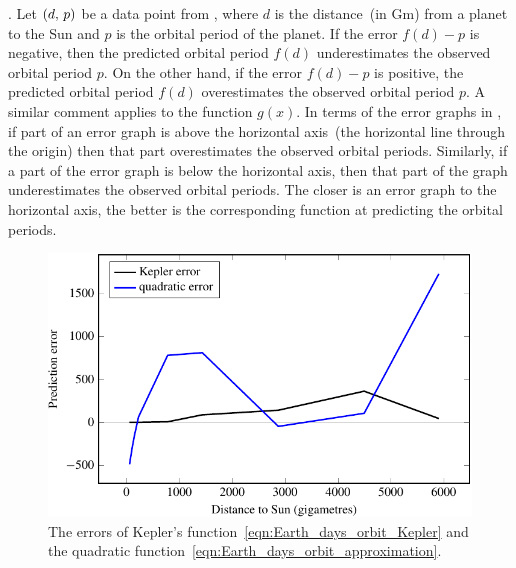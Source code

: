 \documentclass[a4paper,oneside,12pt]{article}
\begin{document}
\begin{problem}
{\begin{solution}
.  Let $\left\lparen{d},\, {p}\right\rparen$ be a
data point from , where $d$ is the
distance~(in Gm) from a planet to the Sun and $p$ is the orbital
period of the planet.  If the error $f(d) - p$ is negative, then the
predicted orbital period $f(d)$ underestimates the observed orbital
period $p$.  On the other hand, if the error $f(d) - p$ is positive,
the predicted orbital period $f(d)$ overestimates the observed orbital
period $p$.  A similar comment applies to the function $g(x)$.  In
terms of the error graphs in
, if part of an error graph
is above the horizontal axis~(the horizontal line through the origin)
then that part overestimates the observed orbital periods.  Similarly,
if a part of the error graph is below the horizontal axis, then that
part of the graph underestimates the observed orbital periods.  The
closer is an error graph to the horizontal axis, the better is the
corresponding function at predicting the orbital periods.

\begin{table}[!htbp]
\centering

\caption{%
  The orbital period of a planet as a function of its distance~(in
  gigametres) to the Sun.  This is the same as
  , but missing entries have been
  filled in.  All numbers in the fourth and fifth columns have been
  rounded to one decimal place.  The sixth and seventh columns list,
  respectively, the errors of Kepler's
   and the quadratic
  .  Numbers in these
  columns have been rounded to two decimal places.  Note that most
  numbers in the table have been rounded in order to fit the table.
  However, you should not round these intermediate results when you
  use them to calculate the root mean square errors.
}
\label{tab:planet_orbital_periods_errors}
\end{table}

\begin{figure}[!htbp]
\centering
\includegraphics[scale=1.1]{image/09/period-error.pdf}
\caption{%
  The errors of Kepler's function~\eqref{eqn:Earth_days_orbit_Kepler}
  and the quadratic
  function~\eqref{eqn:Earth_days_orbit_approximation}.
}
\label{fig:orbital_periods_error_analysis}
\end{figure}


\end{solution}}
\end{problem}
\end{document}
